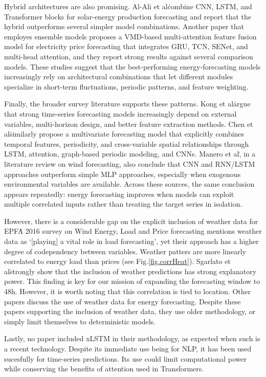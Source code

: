 Hybrid architectures are also promising. Al-Ali et al\. combine CNN, LSTM, and Transformer blocks for solar-energy production forecasting and report that the hybrid outperforms several simpler model combinations\cite{math11030676}. Another paper that employes ensemble models proposes a VMD-based multi-attention feature fusion model for electricity price forecasting that integrates GRU, TCN, SENet, and multi-head attention, and they report strong results against several comparison models\cite{Xu2025}. These studies suggest that the best-performing energy-forecasting models increasingly rely on architectural combinations that let different modules specialize in short-term fluctuations, periodic patterns, and feature weighting.

Finally, the broader survey literature supports these patterns. Kong et al\. argue that strong time-series forecasting models increasingly depend on external variables, multi-horizon design, and better feature extraction methods\cite{Kong2025}. Chen et al\. similarly propose a multivariate forecasting model that explicitly combines temporal features, periodicity, and cross-variable spatial relationships through LSTM, attention, graph-based periodic modeling, and CNNs\cite{CHEN2025126302}. Manero et al\., in a literature review on wind forecasting, also conclude that CNN and RNN/LSTM approaches outperform simple MLP approaches, especially when exogenous environmental variables are available\cite{Manero2018}. Across these sources, the same conclusion appears repeatedly: energy forecasting improves when models can exploit multiple correlated inputs rather than treating the target series in isolation. 

However, there is a considerable gap on the explicit inclusion of weather data for EPF\. A 2016 survey on Wind Energy, Load and Price forecasting mentions weather data as `[playing] a vital role in load forecasting', yet their approach has a higher degree of codependency between variables\cite{7754792}.
Weather patters are more linearly correlated to energy load than prices (see Fig.\ref{fig.corrHeat}). Sgarlato et al\. strongly show that the inclusion of weather predictions has strong explanatory power\cite{9788043}. This finding is key
for our mission of expanding the forecasting window to 48h. However, it is worth noting that this correlation is tied to location. Other papers discuss the use of weather data for energy forecasting\cite{7903735,Brecl2018-zt}. Despite these papers supporting the inclusion of weather data,
they use older methodology, or simply limit themselves to deterministic models.

Lastly, no paper included xLSTM\cite{xLSTM2024} in their methodology, as expected when such is a recent technology. Despite its immediate use being for NLP, it has been used sucesfully for time-series predictions\cite{xLSTMTimeSeries2025,xLSTMMixer}. Its use could limit computational power while conserving the benefits of attention
used in Transformers.